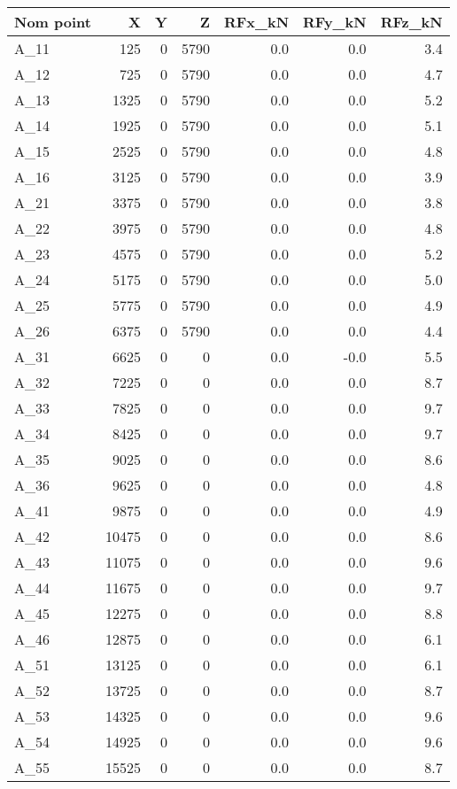 \begin{tabular}{lrrrrrr}
\toprule
Nom point & X & Y & Z & RFx\_kN & RFy\_kN & RFz\_kN \\
\midrule
A\_11 & 125 & 0 & 5790 & 0.0 & 0.0 & 3.4 \\
A\_12 & 725 & 0 & 5790 & 0.0 & 0.0 & 4.7 \\
A\_13 & 1325 & 0 & 5790 & 0.0 & 0.0 & 5.2 \\
A\_14 & 1925 & 0 & 5790 & 0.0 & 0.0 & 5.1 \\
A\_15 & 2525 & 0 & 5790 & 0.0 & 0.0 & 4.8 \\
A\_16 & 3125 & 0 & 5790 & 0.0 & 0.0 & 3.9 \\
A\_21 & 3375 & 0 & 5790 & 0.0 & 0.0 & 3.8 \\
A\_22 & 3975 & 0 & 5790 & 0.0 & 0.0 & 4.8 \\
A\_23 & 4575 & 0 & 5790 & 0.0 & 0.0 & 5.2 \\
A\_24 & 5175 & 0 & 5790 & 0.0 & 0.0 & 5.0 \\
A\_25 & 5775 & 0 & 5790 & 0.0 & 0.0 & 4.9 \\
A\_26 & 6375 & 0 & 5790 & 0.0 & 0.0 & 4.4 \\
A\_31 & 6625 & 0 & 0 & 0.0 & -0.0 & 5.5 \\
A\_32 & 7225 & 0 & 0 & 0.0 & 0.0 & 8.7 \\
A\_33 & 7825 & 0 & 0 & 0.0 & 0.0 & 9.7 \\
A\_34 & 8425 & 0 & 0 & 0.0 & 0.0 & 9.7 \\
A\_35 & 9025 & 0 & 0 & 0.0 & 0.0 & 8.6 \\
A\_36 & 9625 & 0 & 0 & 0.0 & 0.0 & 4.8 \\
A\_41 & 9875 & 0 & 0 & 0.0 & 0.0 & 4.9 \\
A\_42 & 10475 & 0 & 0 & 0.0 & 0.0 & 8.6 \\
A\_43 & 11075 & 0 & 0 & 0.0 & 0.0 & 9.6 \\
A\_44 & 11675 & 0 & 0 & 0.0 & 0.0 & 9.7 \\
A\_45 & 12275 & 0 & 0 & 0.0 & 0.0 & 8.8 \\
A\_46 & 12875 & 0 & 0 & 0.0 & 0.0 & 6.1 \\
A\_51 & 13125 & 0 & 0 & 0.0 & 0.0 & 6.1 \\
A\_52 & 13725 & 0 & 0 & 0.0 & 0.0 & 8.7 \\
A\_53 & 14325 & 0 & 0 & 0.0 & 0.0 & 9.6 \\
A\_54 & 14925 & 0 & 0 & 0.0 & 0.0 & 9.6 \\
A\_55 & 15525 & 0 & 0 & 0.0 & 0.0 & 8.7 \\

\end{tabular}
